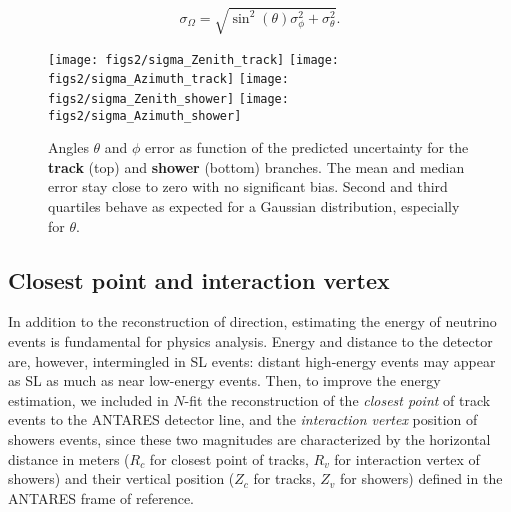 \begin{equation}
	\label{eq:sigma_omega}
	\sigma_\Omega = \sqrt{\sin^2(\theta)\sigma_\phi^2 + \sigma_\theta^2}.
\end{equation}

\begin{figure}[htbp]
	\centering
	\texttt{[image: figs2/sigma\_Zenith\_track]}
	\texttt{[image: figs2/sigma\_Azimuth\_track]}
	\texttt{[image: figs2/sigma\_Zenith\_shower]}
	\texttt{[image: figs2/sigma\_Azimuth\_shower]}
	\caption{\label{fig:sigma}Angles $\theta$ and $\phi$ error as function of the predicted uncertainty for the \textbf{track} (top) and \textbf{shower} (bottom) branches. The mean and median error stay close to zero with no significant bias. Second and third quartiles behave as expected for a Gaussian distribution, especially for $\theta$.}
\end{figure}

	



\subsection{Closest point and interaction vertex}
\label{subsec:closest}


In addition to the reconstruction of direction, estimating the energy of neutrino events is fundamental for physics analysis. Energy and distance to the detector are, however, intermingled in SL events: distant high-energy events may appear as SL as much as near low-energy events. Then, to improve the energy estimation, we included in $N$-fit the reconstruction of the \emph{closest point} of track events to the ANTARES detector line, and the \emph{interaction vertex} position of showers events, since these two magnitudes are characterized by the horizontal distance in meters ($R_c$ for closest point of tracks, $R_v$ for interaction vertex of showers) and their vertical position ($Z_c$ for tracks, $Z_v$ for showers) defined in the ANTARES frame of reference.


